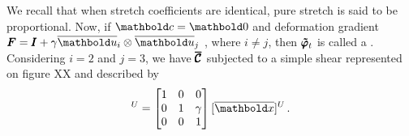 \begin{example}
\begin{center}
\scalebox{.72}{}
\vspace{9pt}
\label{fg:alongPuro}
\end{center}


We recall that when stretch coefficients are identical, pure stretch is said to be proportional. Now, if $\vto{c}=\vto{0}$ and deformation gradient $\tnr{F}=\tnr{I}+\gamma\overline{\vto{u}}_i\otimes\overline{\vto{u}}_j$ , where $i\neq j$, then $\pmb{\tilde{\varphi}}_t$ is called a . Considering $i=2$ and $j=3$, we have $\pmb{\overline{\mathcal{C}}}$ subjected to a simple shear represented on figure XX and described by
\begin{equation*}
[\fua{\tnr{\tilde{\varphi}}_t}{\overline{\vto{x}}}]^U=
\begin{bmatrix}
1 & 0 & 0\\
0 & 1 & \gamma\\
0 & 0 & 1
\end{bmatrix}
[\overline{\vto{x}}]^U\,.
\end{equation*}

\begin{center}
\scalebox{.72}{}
\vspace{9pt}
\label{fg:cisaSimples}
\end{center}


\end{example}
